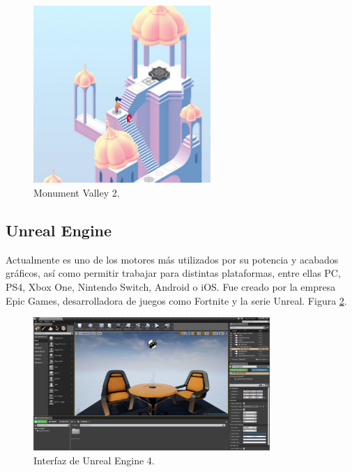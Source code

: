 \begin{figure}[H]
  \centering
\includegraphics[width=0.6\textwidth]{03.EstudioProblema/01.EstadoArte/00.Figuras/27.monument_valley_2.jpg}
    \caption{Monument Valley 2. \cite{EA_img_monumentValley}}
    \label{fig:EA_monumentValley}
\end{figure}


\subsection{Unreal Engine}

Actualmente es uno de los motores más utilizados por su potencia y acabados gráficos, así como permitir trabajar para distintas plataformas, entre ellas PC, PS4, Xbox One, Nintendo Switch, Android o iOS. Fue creado por la empresa Epic Games, desarrolladora de juegos como Fortnite y la serie Unreal. Figura \ref{fig:EA_interfazUnreal}.

\begin{figure}[H]
  \centering
\includegraphics[width=0.8\textwidth]{03.EstudioProblema/01.EstadoArte/00.Figuras/28.interfaz_unreal.png}
    \caption{Interfaz de Unreal Engine 4. \cite{EA_img_interfazUnreal}}
    \label{fig:EA_interfazUnreal}
\end{figure}

